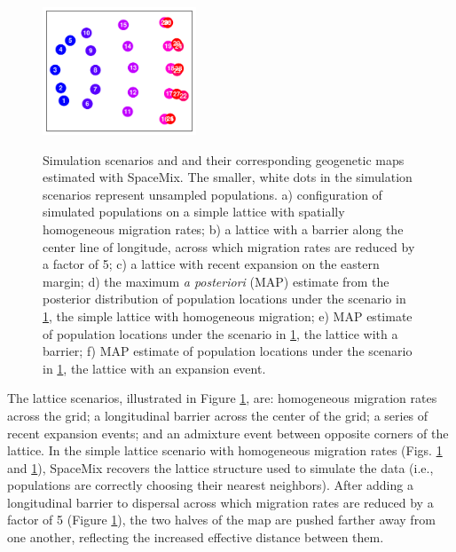 \documentclass[12pt]{article}
\begin{document}
\begin{figure}
			{\includegraphics[width=1.8in,height=1.5in]{figs/sims/GeoGenMap_expansion.pdf}}

	\caption{
    Simulation scenarios and and their corresponding geogenetic maps estimated with SpaceMix.  
    The smaller, white dots in the simulation scenarios represent unsampled populations.  
    a) configuration of simulated populations on a simple lattice with spatially homogeneous migration rates; 
    b) a lattice with a barrier along the center line of longitude, across which migration rates are reduced by a factor of 5; 
    c) a lattice with recent expansion on the eastern margin; 
    d) the maximum \textit{a posteriori} (MAP) estimate from the posterior distribution of population locations under the scenario in \ref{sfig:lattice_scenarios}, the simple lattice with homogeneous migration;  
    e) MAP estimate of population locations under the scenario in \ref{sfig:lattice_scenarios}, the lattice with a barrier; 
    f) MAP estimate of population locations under the scenario in \ref{sfig:lattice_scenarios}, the lattice with an expansion event.
    }\label{sfig:lattice_scenarios}
\end{figure}

The lattice scenarios, illustrated in Figure \ref{sfig:lattice_scenarios}, are: homogeneous migration rates across the grid; a longitudinal barrier across the center of the grid; a series of recent expansion events; and an admixture event between opposite corners of the lattice.  In the simple lattice scenario with homogeneous migration rates (Figs. \ref{sfig:lattice_scenarios} and \ref{sfig:lattice_scenarios}), SpaceMix recovers the lattice structure used to simulate the data (i.e., populations are correctly choosing their nearest neighbors).  
After adding a longitudinal barrier to dispersal across which migration rates are reduced by a factor of 5 (Figure  \ref{sfig:lattice_scenarios}), 
the two halves of the map are pushed farther away from one another, 
reflecting the increased effective distance between them.
\end{document}
